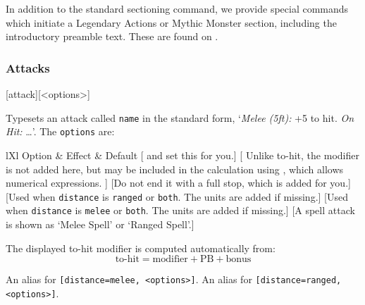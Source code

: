 			In addition to the standard sectioning command, we provide special commands which initiate a Legendary Actions or Mythic Monster section, including the introductory preamble text. These are found on .


		\subsubsection{Attacks}

			[attack]{[<options>]}
			{
				Typesets an attack called \texttt{name} in the standard form, `\textit{Melee (5ft):} +5 to hit. \textit{On Hit:} \ldots'. The \texttt{options} are:
				\begin{RpgTable}[breakable,width=0.8\linewidth]{lXl}
					Option & Effect & Default
					[ and  set this for you.]
					[
						Unlike to-hit, the modifier is not added here, but may be included in the calculation using , which allows numerical expressions.
					]
					[Do not end it with a full stop, which is added for you.]
					[Used when \texttt{distance} is \texttt{ranged} or \texttt{both}. The units are added if missing.]
					[Used when \texttt{distance} is \texttt{melee} or \texttt{both}. The units are added if missing.]
					[A spell attack is shown as `Melee Spell' or `Ranged Spell'.]
				\end{RpgTable}

				The displayed to-hit modifier is computed automatically from:
				\begin{equation*}
					\text{to-hit} = \text{modifier} + \text{PB} + \text{bonus}
				\end{equation*}
			}
			{
				An alias for \texttt{[distance=melee, <options>]}.
			}
			{
				An alias for \texttt{[distance=ranged, <options>]}.
			}


